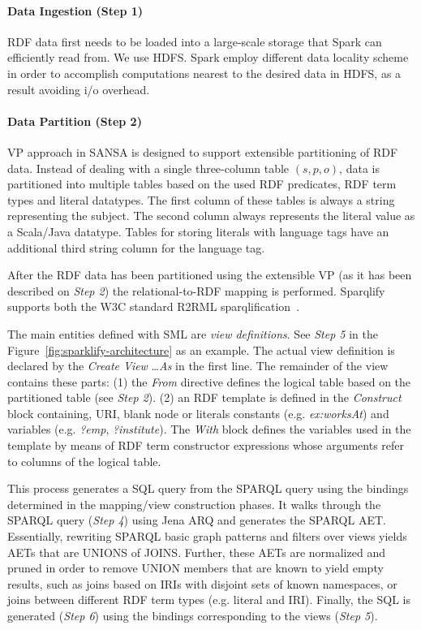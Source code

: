 \paragraph{Data Ingestion (Step 1)} \gls{RDF} data first needs to be loaded into a large-scale storage that Spark can efficiently read from.
We use \gls{HDFS}.
Spark employ different data locality scheme in order to accomplish computations nearest to the desired data in \gls{HDFS}, as a result avoiding i/o overhead. 
\paragraph{Data Partition (Step 2)}
VP approach in SANSA is designed to support extensible partitioning of \gls{RDF} data.
Instead of dealing with a single three-column table $(s, p, o)$, data is partitioned into multiple tables based on the used \gls{RDF} predicates, \gls{RDF} term types and literal datatypes.
The first column of these tables is always a string representing the subject.
The second column always represents the literal value as a Scala/Java datatype.
Tables for storing literals with language tags have an additional third string column for the language tag.

After the \gls{RDF} data has been partitioned using the extensible VP (as it has been described on \textit{Step 2}) the relational-to-RDF mapping is performed. 
Sparqlify supports both the \gls{W3C} standard R2RML
sparqlification~\cite{sml}.

The main entities defined with SML are \textit{view definitions}.
See \textit{Step 5} in the Figure~\ref{fig:sparklify-architecture} as an example.
The actual view definition is declared by the \emph{Create View} \ldots \emph{As} in the first line.
The remainder of the view contains these parts: (1) the \emph{From} directive defines the logical table based on the partitioned table (see \textit{Step 2}).
(2) an \gls{RDF} template is defined in the \emph{Construct} block containing, \gls{URI}, blank node or literals constants (e.g. \emph{ex:worksAt}) and variables (e.g. \emph{?emp}, \emph{?institute}).
The \emph{With} block defines the variables used in the template by means of \gls{RDF} term constructor expressions whose arguments refer to columns of the logical table.

This process generates a SQL query from the \gls{SPARQL} query using the bindings determined in the mapping/view construction phases.
It walks through the \gls{SPARQL} query (\textit{Step 4}) using Jena ARQ and generates the \gls{SPARQL} \gls{AET}. 
Essentially, rewriting \gls{SPARQL} basic graph patterns and filters over views yields \gls{AET}s that are UNIONS of JOINS.
Further, these AETs are normalized and pruned in order to remove UNION members that are known to yield empty results, such as joins based on \gls{IRI}s with disjoint sets of known namespaces, or joins between different \gls{RDF} term types (e.g. literal and \gls{IRI}).
Finally, the SQL is generated (\textit{Step 6}) using the bindings corresponding to the views (\textit{Step 5}).

